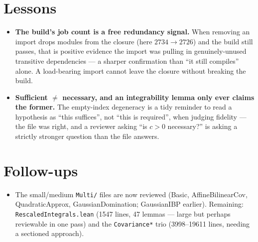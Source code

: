 \documentclass[11pt]{article}
\begin{document}
\section{Lessons}
\begin{itemize}[noitemsep]
  \item \textbf{The build's job count is a free redundancy signal.} When removing an import drops modules from
    the closure (here $2734\to2726$) and the build still passes, that is positive evidence the import was
    pulling in genuinely-unused transitive dependencies --- a sharper confirmation than ``it still compiles''
    alone. A load-bearing import cannot leave the closure without breaking the build.
  \item \textbf{Sufficient $\ne$ necessary, and an integrability lemma only ever claims the former.} The
    empty-index degeneracy is a tidy reminder to read a hypothesis as ``this suffices'', not ``this is
    required'', when judging fidelity --- the file was right, and a reviewer asking ``is $c>0$ necessary?''
    is asking a strictly stronger question than the file answers.
\end{itemize}

\section{Follow-ups}
\begin{itemize}[noitemsep]
  \item The small/medium \texttt{Multi/} files are now reviewed (Basic, AffineBilinearCov, QuadraticApprox,
    GaussianDomination; GaussianIBP earlier). Remaining: \texttt{RescaledIntegrals.lean} (1547 lines, 47
    lemmas --- large but perhaps reviewable in one pass) and the \texttt{Covariance*} trio (3998--19611
    lines, needing a sectioned approach).
\end{itemize}
\end{document}
